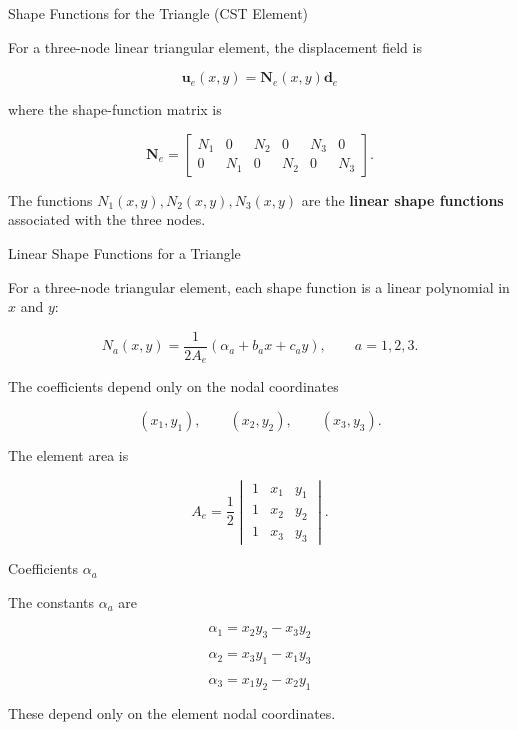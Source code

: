 \documentclass[aspectratio=169]{beamer}
\begin{document}
\begin{frame}{Shape Functions for the Triangle (CST Element)}

For a three-node linear triangular element, the displacement field is

\[
\mathbf{u}_e(x,y)=\mathbf{N}_e(x,y)\mathbf{d}_e
\]

where the shape-function matrix is

\[
\mathbf{N}_e=
\begin{bmatrix}
N_1 & 0 & N_2 & 0 & N_3 & 0\\
0 & N_1 & 0 & N_2 & 0 & N_3
\end{bmatrix}.
\]

The functions \(N_1(x,y), N_2(x,y), N_3(x,y)\) are the
\textbf{linear shape functions} associated with the three nodes.

\end{frame}
\begin{frame}{Linear Shape Functions for a Triangle}

For a three-node triangular element, each shape function is a
linear polynomial in \(x\) and \(y\):

\[
N_a(x,y)=\frac{1}{2A_e}\left(\alpha_a+b_a x+c_a y\right),
\qquad a=1,2,3.
\]

The coefficients depend only on the nodal coordinates

\[
(x_1,y_1),\qquad (x_2,y_2),\qquad (x_3,y_3).
\]

The element area is

\[
A_e=
\frac12
\begin{vmatrix}
1 & x_1 & y_1\\
1 & x_2 & y_2\\
1 & x_3 & y_3
\end{vmatrix}.
\]

\end{frame}
\begin{frame}{Coefficients \(\alpha_a\)}

The constants \( \alpha_a \) are

\[
\alpha_1 = x_2y_3 - x_3y_2
\]

\[
\alpha_2 = x_3y_1 - x_1y_3
\]

\[
\alpha_3 = x_1y_2 - x_2y_1
\]

These depend only on the element nodal coordinates.

\end{frame}
\end{document}
